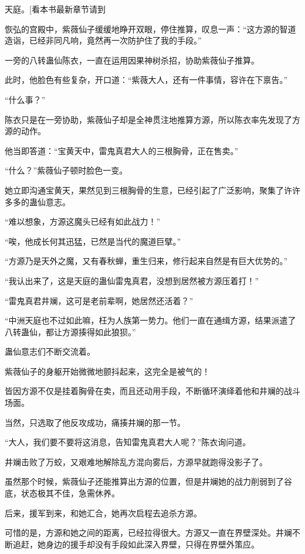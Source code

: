 
\begin{this_body}

天庭。[看本书最新章节请到

恢弘的宫殿中，紫薇仙子缓缓地睁开双眼，停住推算，叹息一声：“这方源的智道造诣，已经非同凡响，竟然再一次防护住了我的手段。”

一旁的八转蛊仙陈衣，一直在运用因果神树杀招，协助紫薇仙子推算。

此时，他脸色有些复杂，开口道：“紫薇大人，还有一件事情，容许在下禀告。”

“什么事？”

陈衣只是在一旁协助，紫薇仙子却是全神贯注地推算方源，所以陈衣率先发现了方源的动作。

他当即答道：“宝黄天中，雷鬼真君大人的三根胸骨，正在售卖。”

“什么？”紫薇仙子顿时脸色一变。

她立即沟通宝黄天，果然见到三根胸骨的生意，已经引起了广泛影响，聚集了许许多多的蛊仙意志。

“难以想象，方源这魔头已经有如此战力！”

“唉，他成长何其迅猛，已然是当代的魔道巨擘。”

“方源乃是天外之魔，又有春秋蝉，重生归来，修行起来自然是有巨大优势的。”

“我认出来了，这是天庭的蛊仙雷鬼真君，没想到居然被方源压着打！”

“雷鬼真君井斓，这可是老前辈啊，她居然还活着？”

“中洲天庭也不过如此嘛，枉为人族第一势力。他们一直在通缉方源，结果派遣了八转蛊仙，都让方源揍得如此狼狈。”

蛊仙意志们不断交流着。

紫薇仙子的身躯开始微微地颤抖起来，这完全是被气的！

皆因方源不仅是挂着胸骨在卖，而且还动用手段，不断循环演绎着他和井斓的战斗场面。

当然，只选取了他反攻成功，痛揍井斓的那一节。

“大人，我们要不要将这消息，告知雷鬼真君大人呢？”陈衣询问道。

井斓击败了万蛟，又艰难地解除乱方混向雾后，方源早就跑得没影子了。

虽然那个时候，紫薇仙子还能推算出方源的位置，但是井斓她的战力削弱到了谷底，状态极其不佳，急需休养。

后来，援军到来，和她汇合，她再次启程去追杀方源。

可惜的是，方源和她之间的距离，已经拉得很大。方源又一直在界壁深处。井斓不断追赶，她身边的援手却没有手段如此深入界壁，只得在界壁外策应。


\end{this_body}
